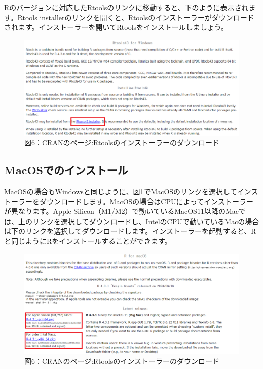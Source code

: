 \documentclass[
  letterpaper,
  DIV=11,
  numbers=noendperiod]{scrreprt}
\begin{document}
Rのバージョンに対応したRtoolsのリンクに移動すると、下のように表示されます。Rtools
installerのリンクを開くと、Rtoolsのインストーラーがダウンロードされます。インストーラーを開いてRtoolsをインストールしましょう。

\begin{figure}

{\centering \includegraphics{././image/CRAN_install6_Rtools.png}

}

\caption{図6：CRANのページ:Rtoolsのインストーラーのダウンロード}

\end{figure}

\hypertarget{macosux3067ux306eux30a4ux30f3ux30b9ux30c8ux30fcux30eb}{%
\subsection{MacOSでのインストール}\label{macosux3067ux306eux30a4ux30f3ux30b9ux30c8ux30fcux30eb}}

MacOSの場合もWindowsと同じように、図1でMacOSのリンクを選択してインストーラーをダウンロードします。MacOSの場合はCPUによってインストーラーが異なります。Apple
Silicon（M1/M2）で動いているMacOS11以降のMacでは、上のリンクを選択してダウンロードし、IntelのCPUで動いているMacの場合は下のリンクを選択してダウンロードします。インストーラーを起動すると、Rと同じようにRをインストールすることができます。

\begin{figure}

{\centering \includegraphics{././image/CRAN_install7_mac.png}

}

\caption{図6：CRANのページ:Rtoolsのインストーラーのダウンロード}

\end{figure}
\end{document}
